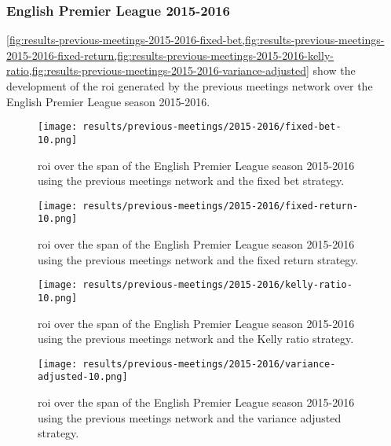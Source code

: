 \subsubsection{English Premier League 2015-2016}

\cref{fig:results-previous-meetings-2015-2016-fixed-bet,fig:results-previous-meetings-2015-2016-fixed-return,fig:results-previous-meetings-2015-2016-kelly-ratio,fig:results-previous-meetings-2015-2016-variance-adjusted} show the development of the \gls{roi} generated by the previous meetings network over the English Premier League season 2015-2016.
\begin{figure}
    \centering
    \texttt{[image: results/previous-meetings/2015-2016/fixed-bet-10.png]}
    \caption{\gls{roi} over the span of the English Premier League season 2015-2016 using the previous meetings network and the fixed bet strategy.}
    \label{fig:results-previous-meetings-2015-2016-fixed-bet}
\end{figure}
\begin{figure}
    \centering
    \texttt{[image: results/previous-meetings/2015-2016/fixed-return-10.png]}
    \caption{\gls{roi} over the span of the English Premier League season 2015-2016 using the previous meetings network and the fixed return strategy.}
    \label{fig:results-previous-meetings-2015-2016-fixed-return}
\end{figure}
\begin{figure}
    \centering
    \texttt{[image: results/previous-meetings/2015-2016/kelly-ratio-10.png]}
    \caption{\gls{roi} over the span of the English Premier League season 2015-2016 using the previous meetings network and the Kelly ratio strategy.}
    \label{fig:results-previous-meetings-2015-2016-kelly-ratio}
\end{figure}
\begin{figure}
    \centering
    \texttt{[image: results/previous-meetings/2015-2016/variance-adjusted-10.png]}
    \caption{\gls{roi} over the span of the English Premier League season 2015-2016 using the previous meetings network and the variance adjusted strategy.}
    \label{fig:results-previous-meetings-2015-2016-variance-adjusted}
\end{figure}

